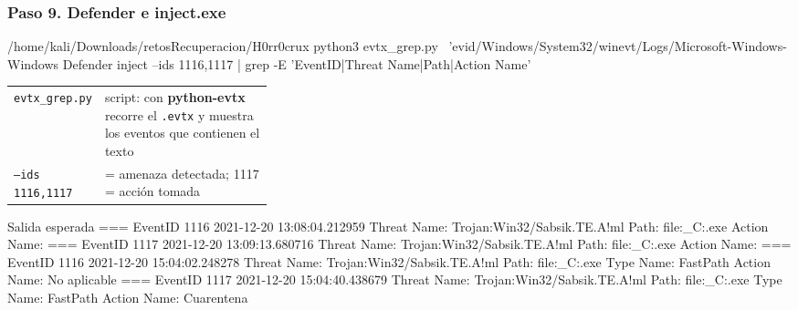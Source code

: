 \documentclass[11pt,a4paper]{article}
\begin{document}
\subsubsection*{Paso 9. Defender e inject.exe}
\begin{comando}{/home/kali/Downloads/retosRecuperacion/H0rr0crux}
python3 evtx_grep.py \
  'evid/Windows/System32/winevt/Logs/Microsoft-Windows-Windows Defender%
  inject --ids 1116,1117 | grep -E 'EventID|Threat Name|Path|Action Name'
\end{comando}
\begin{tcolorbox}[enhanced, breakable, colback=white, colframe=gray!40, boxrule=0.3pt, arc=1pt, left=4pt, right=4pt, top=2pt, bottom=2pt, fonttitle=\sffamily\scriptsize\bfseries, coltitle=black!75, colbacktitle=gray!8, title={Qué hace cada parte}, attach title to upper, before skip=2pt, after skip=4pt, fontupper=\small]
\par{\renewcommand{\arraystretch}{1.12}\begin{tabularx}{\linewidth}{@{}>{\raggedright\arraybackslash}p{0.33\linewidth}>{\raggedright\arraybackslash}X@{}}
\texttt{evtx\_\allowbreak{}grep.py} & script: con \textbf{python-evtx} recorre el \texttt{.evtx} y muestra los eventos que contienen el texto \\
\texttt{--ids 1116,\allowbreak{}1117} & 1116 = amenaza detectada; 1117 = acción tomada \\
\end{tabularx}}
\end{tcolorbox}
\begin{salidan}{Salida esperada}
=== EventID 1116  2021-12-20 13:08:04.212959
   Threat Name: Trojan:Win32/Sabsik.TE.A!ml
   Path: file:_C:\Users\Public\Downloads\inject.exe
   Action Name: %
=== EventID 1117  2021-12-20 13:09:13.680716
   Threat Name: Trojan:Win32/Sabsik.TE.A!ml
   Path: file:_C:\Users\Public\Downloads\inject.exe
   Action Name: %
=== EventID 1116  2021-12-20 15:04:02.248278
   Threat Name: Trojan:Win32/Sabsik.TE.A!ml
   Path: file:_C:\Users\Gregor\Downloads\inject.exe
   Type Name: FastPath
   Action Name: No aplicable
=== EventID 1117  2021-12-20 15:04:40.438679
   Threat Name: Trojan:Win32/Sabsik.TE.A!ml
   Path: file:_C:\Users\Gregor\Downloads\inject.exe
   Type Name: FastPath
   Action Name: Cuarentena
\end{salidan}
\end{document}
